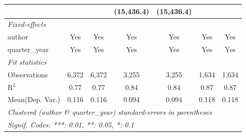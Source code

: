 \begin{tabular}{lcccccc}
                                         &               &               & (15,436.4)     & (15,436.4)     &                &   \\   
   \midrule
   \emph{Fixed-effects}\\
   author                                & Yes           & Yes           & Yes            & Yes            & Yes            & Yes\\  
   quarter\_year                         & Yes           & Yes           & Yes            & Yes            & Yes            & Yes\\  
   \midrule
   \emph{Fit statistics}\\
   Observations                          & 6,372         & 6,372         & 3,255          & 3,255          & 1,634          & 1,634\\  
   R$^2$                                 & 0.77          & 0.77          & 0.84           & 0.84           & 0.87           & 0.87\\  
Mean(Dep. Var.) & 0.116 & 0.116 & 0.094 & 0.094 & 0.118 & 0.118 \\
   \midrule \midrule
   \multicolumn{7}{l}{\emph{Clustered (author \& quarter\_year) standard-errors in parentheses}}\\
   \multicolumn{7}{l}{\emph{Signif. Codes: ***: 0.01, **: 0.05, *: 0.1}}\\
\end{tabular}
\par\endgroup
